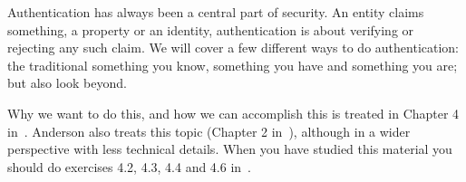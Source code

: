 Authentication has always been a central part of security.
An entity claims something, a property or an identity, authentication is about 
verifying or rejecting any such claim.
We will cover a few different ways to do authentication: the traditional 
something you know, something you have and something you are; but also look 
beyond.

Why we want to do this, and how we can accomplish this is treated in Chapter 
4 in~\cite{Gollmann2011cs}.
Anderson also treats this topic (Chapter 2 in~\cite{Anderson2008sea}), although 
in a wider perspective with less technical details.
When you have studied this material you should do exercises 4.2, 4.3, 4.4 and 
4.6 in~\cite{Gollmann2011cs}.
